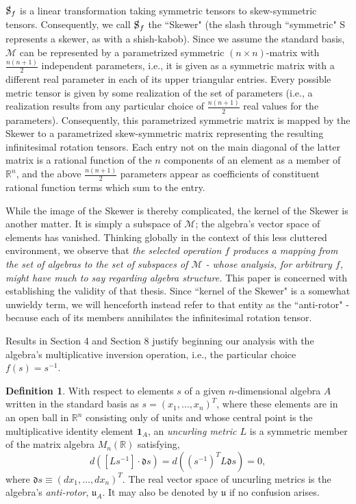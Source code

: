 \documentclass{amsart}
\numberwithin{equation}{section}
\theoremstyle{definition}
\newtheorem{definition}[theorem]{Definition}
\numberwithin{theorem}{section}
\begin{document}
$\slashed{\text{S}}_f$ is a linear transformation taking symmetric tensors to skew-symmetric tensors. Consequently, we call $\slashed{\text{S}}_f$ the ``Skewer" (the slash through ``symmetric" S represents a skewer, as with a shish-kabob). Since we assume the standard basis, $\mathcal{M}$ can be represented by a parametrized symmetric $(n\times n)$-matrix with $\frac{n(n+1)}{2}$ independent parameters, i.e., it is given as a symmetric matrix with a different real parameter in each of its upper triangular entries.  Every possible metric tensor is given by some realization of the set of parameters (i.e., a realization results from any particular choice of $\frac{n(n+1)}{2}$ real values for the parameters).  Consequently, this parametrized symmetric matrix is mapped by the Skewer to a parametrized skew-symmetric matrix representing the resulting infinitesimal rotation tensors.  Each entry not on the main diagonal of the latter matrix is a rational function of the $n$ components of an element as a member of $\mathbb{R}^n$, and the above $\frac{n(n+1)}{2}$ parameters appear as coefficients of constituent rational function terms which sum to the entry.  

While the image of the Skewer is thereby complicated, the kernel of the Skewer is another matter.  It is simply a subspace of $\mathcal{M}$;  the algebra's vector space of elements has vanished.  Thinking globally in the context of this less cluttered environment, we observe that
{\it the selected operation $f$ produces a mapping from the set of algebras to the set of subspaces of $\mathcal{M}$ - whose analysis, for arbitrary $f$, might have much to say regarding algebra structure.}
This paper is concerned with establishing the validity of that thesis. 
  Since ``kernel of the Skewer" is a somewhat unwieldy term, we will henceforth instead refer to that entity as the ``anti-rotor" - because each of its members annihilates the infinitesimal rotation tensor.
  
Results in Section 4 and Section 8 justify beginning our analysis with the algebra's multiplicative inversion operation, i.e., the particular choice $f(s)=s^{-1}$.  

     \begin{definition}\label{7/21/23.1} With respect to elements $s$ of a given $n$-dimensional algebra $A$ written in the standard basis as $s= (x_1,\dots,x_n)^T$, where these elements are in an open ball in $\mathbb{R}^n$ consisting only of units and whose central point is the multiplicative identity element $\mathbf{1}_A$, an {\it uncurling metric $L$} is a symmetric member of the matrix algebra $M_n(\mathbb{R})$  satisfying, \begin{equation}\label{4/7/23.1} d\left([Ls^{-1}]\cdot \mathfrak{d}s\right) = d\left((s^{-1})^T L \mathfrak{d}s\right) = 0, \end{equation} where $\mathfrak{d}s \equiv (dx_1,\dots,dx_n)^T$.  The real vector space of uncurling metrics is the algebra's {\it anti-rotor}, $\mathfrak{u}_A$.  It may also be denoted by $\mathfrak{u}$ if no confusion arises.    \end{definition}
     
\end{document}
